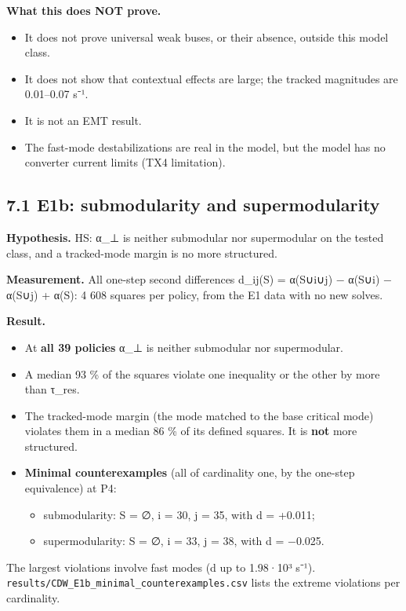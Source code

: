 \documentclass[10pt,a4paper]{article}
\begin{document}
\textbf{What this does NOT prove.}

\begin{itemize}
\item It does not prove universal weak buses, or their absence, outside this model class.
\item It does not show that contextual effects are large; the tracked magnitudes are 0.01–0.07 s⁻¹.
\item It is not an EMT result.
\item The fast-mode destabilizations are real in the model, but the model has no converter current limits (TX4 limitation).
\end{itemize}
\subsection{7.1 E1b: submodularity and supermodularity}
\textbf{Hypothesis.} HS: α\_⊥ is neither submodular nor supermodular on the tested class, and a tracked-mode margin is no more structured.

\textbf{Measurement.} All one-step second differences d\_ij(S) = α(S∪i∪j) − α(S∪i) − α(S∪j) + α(S): 4 608 squares per policy, from the E1 data with no new solves.

\textbf{Result.}

\begin{itemize}
\item At \textbf{all 39 policies} α\_⊥ is neither submodular nor supermodular.
\item A median 93 \% of the squares violate one inequality or the other by more than τ\_res.
\item The tracked-mode margin (the mode matched to the base critical mode) violates them in a median 86 \% of its defined squares. It is \textbf{not} more structured.
\item \textbf{Minimal counterexamples} (all of cardinality one, by the one-step equivalence) at P4:
\begin{itemize}
\item submodularity: S = ∅, i = 30, j = 35, with d = +0.011;
\item supermodularity: S = ∅, i = 33, j = 38, with d = −0.025.
\end{itemize}
\end{itemize}
The largest violations involve fast modes (d up to 1.98·10³ s⁻¹). \texttt{results/\allowbreak{}CDW\_\allowbreak{}E1b\_\allowbreak{}minimal\_\allowbreak{}counterexamples.csv} lists the extreme violations per cardinality.
\end{document}
